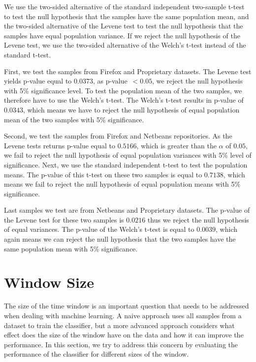 We use the two-sided alternative of the standard independent two-sample t-test to test the null hypothesis that the samples have the same population mean, and the two-sided alternative of the Levene test to test the null hypothesis that the samples have equal population variance. If we reject the null hypothesis of the Levene test, we use the two-sided alternative of the Welch's t-test instead of the standard t-test.

First, we test the samples from Firefox and Proprietary datasets. The Levene test yields p-value equal to $0.0373$, as p-value~$< 0.05$, we reject the null hypothesis with 5\% significance level. To test the population mean of the two samples, we therefore have to use the Welch's t-test. The Welch's t-test results in p-value of $0.0343$, which means we have to reject the null hypothesis of equal population mean of the two samples with 5\% significance.

Second, we test the samples from Firefox and Netbeans repositories. As the Levene tests returns p-value equal to $0.5166$, which is greater than the $\alpha$ of $0.05$, we fail to reject the null hypothesis of equal population variances with 5\% level of significance. Next, we use the standard independent t-test to test the population means. The p-value of this t-test on these two samples is equal to $0.7138$, which means we fail to reject the null hypothesis of equal population means with 5\% significance.

Last samples we test are from Netbeans and Proprietary datasets. The p-value of the Levene test for these two samples is $0.0216$ thus we reject the null hypothesis of equal variances. The p-value of the Welch's t-test is equal to $0.0039$, which again means we can reject the null hypothesis that the two samples have the same population mean with 5\% significance.

\section{Window Size}
\label{section:window-size}

The size of the time window is an important question that needs to be addressed when dealing with machine learning. A naive approach uses all samples from a dataset to train the classifier, but a more advanced approach considers what effect does the size of the window have on the data and how it can improve the performance. In this section, we try to address this concern by evaluating the performance of the classifier for different sizes of the window.

